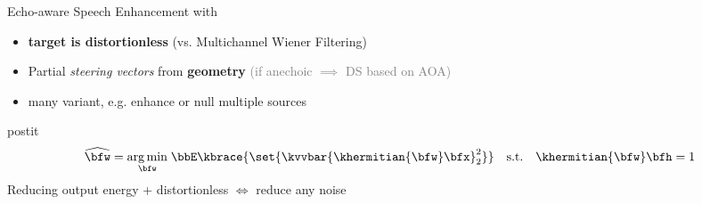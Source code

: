 \begin{frame}[t]{Echo-aware Speech Enhancement with \dechorate}
    \pause
    \begin{itemize}
        \small
        \item \textbf{target is distortionless} (vs. Multichannel Wiener Filtering)
        \item Partial \textit{steering vectors} from \textbf{geometry} \hspace{1em}\textcolor{gray}{\small(if anechoic $\implies$ DS based on AOA)}
        \item many variant, e.g. enhance or null multiple sources~\cite{gannot2017consolidated}
    \end{itemize}

    \pause
    \vfill
    \vspace*{.25em}
    \begin{beamercolorbox}[sep=.5em]{postit}
        \centering
        \begin{equation*}
            \widehat{\bfw} = \underset{\bfw}{\arg\min} \;
            \bbE\kbrace{\set{ \kvvbar{\khermitian{\bfw} \bfx }_2^2}}
            \quad\text{s.t.}\quad\khermitian{\bfw}\bfh = 1
        \end{equation*}
        \textcolor{myred}{\small Reducing output energy + distortionless $\Leftrightarrow$ reduce any noise}
    \end{beamercolorbox}

\end{frame}

